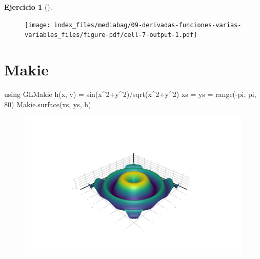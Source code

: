 \documentclass[
  a4paper,
]{scrreport}
\newenvironment{Shaded}{\begin{snugshade}}{\end{snugshade}}
\newcommand{\BuiltInTok}[1]{\textcolor[rgb]{0.00,0.23,0.31}{#1}}
\newcommand{\ConstantTok}[1]{\textcolor[rgb]{0.56,0.35,0.01}{#1}}
\newcommand{\FloatTok}[1]{\textcolor[rgb]{0.68,0.00,0.00}{#1}}
\newcommand{\FunctionTok}[1]{\textcolor[rgb]{0.28,0.35,0.67}{#1}}
\newcommand{\ImportTok}[1]{\textcolor[rgb]{0.00,0.46,0.62}{#1}}
\newcommand{\NormalTok}[1]{\textcolor[rgb]{0.00,0.23,0.31}{#1}}
\newcommand{\OperatorTok}[1]{\textcolor[rgb]{0.37,0.37,0.37}{#1}}
\theoremstyle{definition}
\newtheorem{exercise}{Ejercicio}[chapter]
\theoremstyle{remark}
\begin{document}
\begin{exercise}[]
\begin{enumerate}
\begin{tcolorbox}
  \begin{figure}[H]

  {\centering \texttt{[image: index\_files/mediabag/09-derivadas-funciones-varias-variables\_files/figure-pdf/cell-7-output-1.pdf]}

  }

  \end{figure}

  \section{Makie}

\begin{Shaded}
\begin{Highlighting}[]
\ImportTok{using} \BuiltInTok{GLMakie}
\FunctionTok{h}\NormalTok{(x, y) }\OperatorTok{=} \FunctionTok{sin}\NormalTok{(x}\OperatorTok{\^{}}\FloatTok{2}\OperatorTok{+}\NormalTok{y}\OperatorTok{\^{}}\FloatTok{2}\NormalTok{)}\OperatorTok{/}\FunctionTok{sqrt}\NormalTok{(x}\OperatorTok{\^{}}\FloatTok{2}\OperatorTok{+}\NormalTok{y}\OperatorTok{\^{}}\FloatTok{2}\NormalTok{)}
\NormalTok{xs }\OperatorTok{=}\NormalTok{ ys }\OperatorTok{=} \FunctionTok{range}\NormalTok{(}\OperatorTok{{-}}\ConstantTok{pi}\NormalTok{, }\ConstantTok{pi}\NormalTok{, }\FloatTok{80}\NormalTok{)}
\NormalTok{Makie.}\FunctionTok{surface}\NormalTok{(xs, ys, h)}
\end{Highlighting}
\end{Shaded}

  \begin{figure}[H]

  {\centering \includegraphics{09-derivadas-funciones-varias-variables_files/figure-pdf/cell-8-output-1.png}

  }

  \end{figure}

  \end{tcolorbox}
\end{enumerate}

\end{exercise}
\end{document}
